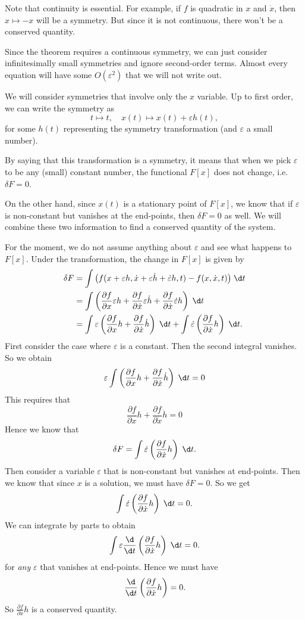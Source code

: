 \documentclass[a4paper]{article}
\begin{document}
Note that continuity is essential. For example, if $f$ is quadratic in $x$ and $\dot{x}$, then $x\mapsto -x$ will be a symmetry. But since it is not continuous, there won't be a conserved quantity.

Since the theorem requires a continuous symmetry, we can just consider infinitesimally small symmetries and ignore second-order terms. Almost every equation will have some $O(\varepsilon^2)$ that we will not write out.

We will consider symmetries that involve only the $x$ variable. Up to first order, we can write the symmetry as
\[
  t \mapsto t,\quad x(t)\mapsto x(t) + \varepsilon h(t),
\]
for some $h(t)$ representing the symmetry transformation (and $\varepsilon$ a small number).

By saying that this transformation is a symmetry, it means that when we pick $\varepsilon$ to be any (small) constant number, the functional $F[x]$ does not change, i.e.\ $\delta F = 0$.

On the other hand, since $x(t)$ is a stationary point of $F[x]$, we know that if $\varepsilon$ is non-constant but vanishes at the end-points, then $\delta F = 0$ as well. We will combine these two information to find a conserved quantity of the system.

For the moment, we do not assume anything about $\varepsilon$ and see what happens to $F[x]$. Under the transformation, the change in $F[x]$ is given by
\begin{align*}
  \delta F &= \int \big(f(x + \varepsilon h, \dot{x} + \varepsilon \dot{h} + \dot{\varepsilon} h, t) - f(x, \dot{x}, t)\big)\;\d t\\
  &= \int\left(\frac{\partial f}{\partial x}\varepsilon h + \frac{\partial f}{\partial \dot{x}}\varepsilon \dot{h} + \frac{\partial f}{\partial \dot{x}}\dot{\varepsilon} h\right)\;\d t\\
  &= \int \varepsilon\left(\frac{\partial f}{\partial x}h + \frac{\partial f}{\partial \dot{x}}\dot{h}\right)\;\d t + \int \dot{\varepsilon} \left(\frac{\partial f}{\partial \dot{x}}h\right)\;\d t.
\end{align*}
First consider the case where $\varepsilon$ is a constant. Then the second integral vanishes. So we obtain
\[
  \varepsilon \int \left(\frac{\partial f}{\partial x}h + \frac{\partial f}{\partial\dot{x}}\dot{h}\right)\;\d t = 0
\]
This requires that
\[
  \frac{\partial f}{\partial x}h + \frac{\partial f}{\partial\dot{x}}\dot{h} = 0
\]
Hence we know that
\[
  \delta F = \int\dot{\varepsilon}\left(\frac{\partial f}{\partial \dot{x}}h\right)\;\d t.
\]
Then consider a variable $\varepsilon$ that is non-constant but vanishes at end-points. Then we know that since $x$ is a solution, we must have $\delta F = 0$. So we get
\[
  \int\dot{\varepsilon}\left(\frac{\partial f}{\partial \dot{x}}h\right)\;\d t = 0.
\]
We can integrate by parts to obtain
\[
  \int \varepsilon \frac{\d}{\d t}\left(\frac{\partial f}{\partial \dot{x}}h\right)\;\d t = 0.
\]
for \emph{any} $\varepsilon$ that vanishes at end-points. Hence we must have
\[
  \frac{\d}{\d t}\left(\frac{\partial f}{\partial \dot{x}}h\right) = 0.
\]
So $\frac{\partial f}{\partial \dot{x}}h$ is a conserved quantity.
\end{document}
